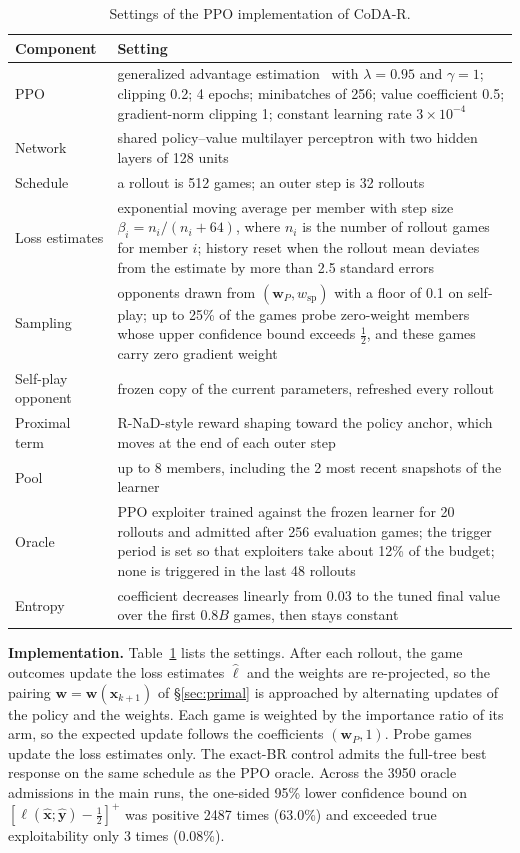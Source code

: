 \documentclass{article}
\theoremstyle{plain}
\theoremstyle{remark}
\newcommand{\bx}{{\bm{x}}}
\newcommand{\by}{{\bm{y}}}
\newcommand{\bw}{{\bm{w}}}
\newcommand{\bell}{{\bm{\ell}}}
\newcommand{\wsp}{w_{\mathrm{sp}}}
\newcommand{\codar}{CoDA-R}
\begin{document}
\begin{table}[!htbp]
\caption{Settings of the PPO implementation of \codar{}.}
\label{tab:settings}
\begin{center}
\footnotesize
\begin{tabular}{lp{11cm}}
\toprule
Component & Setting \\
\midrule
PPO & generalized advantage estimation~\citep{schulman2016gae} with $\lambda=0.95$ and $\gamma=1$; clipping 0.2; 4 epochs; minibatches of 256; value coefficient 0.5; gradient-norm clipping 1; constant learning rate $3\times10^{-4}$ \\
Network & shared policy--value multilayer perceptron with two hidden layers of 128 units \\
Schedule & a rollout is 512 games; an outer step is 32 rollouts \\
Loss estimates & exponential moving average per member with step size $\beta_i=n_i/(n_i+64)$, where $n_i$ is the number of rollout games for member $i$; history reset when the rollout mean deviates from the estimate by more than 2.5 standard errors \\
Sampling & opponents drawn from $(\bw_P,\wsp)$ with a floor of 0.1 on self-play; up to 25\% of the games probe zero-weight members whose upper confidence bound exceeds $\tfrac12$, and these games carry zero gradient weight \\
Self-play opponent & frozen copy of the current parameters, refreshed every rollout \\
Proximal term & R-NaD-style reward shaping toward the policy anchor, which moves at the end of each outer step \\
Pool & up to 8 members, including the 2 most recent snapshots of the learner \\
Oracle & PPO exploiter trained against the frozen learner for 20 rollouts and admitted after 256 evaluation games; the trigger period is set so that exploiters take about 12\% of the budget; none is triggered in the last 48 rollouts \\
Entropy & coefficient decreases linearly from 0.03 to the tuned final value over the first $0.8B$ games, then stays constant \\
\bottomrule
\end{tabular}
\end{center}
\end{table}

\textbf{Implementation.} Table~\ref{tab:settings} lists the settings. After each rollout, the game outcomes update the loss estimates $\hat{\bell}$ and the weights are re-projected, so the pairing $\bw=\bw(\bx_{k+1})$ of \S\ref{sec:primal} is approached by alternating updates of the policy and the weights. Each game is weighted by the importance ratio of its arm, so the expected update follows the coefficients $(\bw_P,1)$. Probe games update the loss estimates only. The exact-BR control admits the full-tree best response on the same schedule as the PPO oracle. Across the 3950 oracle admissions in the main runs, the one-sided 95\% lower confidence bound on $[\ell(\hat\bx;\hat\by)-\tfrac12]^+$ was positive 2487 times (63.0\%) and exceeded true exploitability only 3 times (0.08\%).
\end{document}
